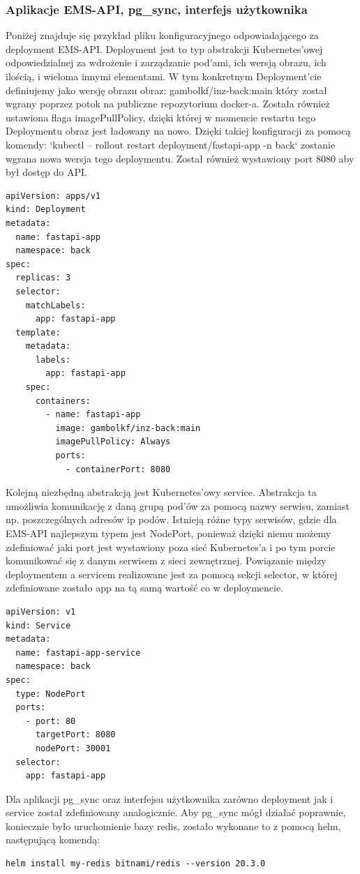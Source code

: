 \subsubsection{Aplikacje EMS-API, pg\_sync, interfejs użytkownika}
Poniżej znajduje się przykład pliku konfiguracyjnego odpowiadającego za deployment EMS-API. Deployment jest to typ abstrakcji Kubernetes'owej odpowiedzialnej za wdrożenie i zarządzanie pod'ami, ich wersją obrazu, ich ilością, i wieloma innymi elementami. W tym konkretnym Deployment'cie definiujemy jako wersję obrazu obraz: gambolkf/inz-back:main który został wgrany poprzez potok na publiczne repozytorium docker-a. Została również ustawiona flaga imagePullPolicy, dzięki której w momencie restartu tego Deploymentu obraz jest ładowany na nowo. Dzięki takiej konfiguracji za pomocą komendy: `kubectl -- rollout restart deployment/fastapi-app -n back` zostanie wgrana nowa wersja tego deploymentu. Został również wystawiony port 8080 aby był dostęp do API.
\begin{verbatim}
apiVersion: apps/v1
kind: Deployment
metadata:
  name: fastapi-app
  namespace: back
spec:
  replicas: 3
  selector:
    matchLabels:
      app: fastapi-app
  template:
    metadata:
      labels:
        app: fastapi-app
    spec:
      containers:
        - name: fastapi-app
          image: gambolkf/inz-back:main
          imagePullPolicy: Always
          ports:
            - containerPort: 8080
\end{verbatim}
Kolejną niezbędną abstrakcją jest Kubernetes'owy service. Abstrakcja ta umożliwia komunikację z daną grupą pod'ów za pomocą nazwy serwisu, zamiast np. poszczególnych adresów ip podów. Istnieją różne  typy serwisów, gdzie dla EMS-API najlepszym typem jest NodePort, ponieważ dzięki niemu możemy zdefiniować jaki port jest wystawiony poza sieć Kubernetes'a i po tym porcie komunikować się z danym serwisem z sieci zewnętrznej. Powiązanie między deploymentem a servicem realizowane jest za pomocą sekcji selector, w której zdefiniowane zostało app na tą samą wartość co w deploymencie.
\begin{verbatim}
apiVersion: v1
kind: Service
metadata:
  name: fastapi-app-service
  namespace: back
spec:
  type: NodePort
  ports:
    - port: 80
      targetPort: 8080
      nodePort: 30001
  selector:
    app: fastapi-app
\end{verbatim}

Dla aplikacji pg\_sync oraz interfejsu użytkownika zarówno deployment jak i service został zdefiniowany analogicznie. Aby pg\_sync mógł działać poprawnie, koniecznie było uruchomienie bazy redis, zostało wykonane to z pomocą helm, następującą komendą:
\begin{verbatim}
helm install my-redis bitnami/redis --version 20.3.0
\end{verbatim}

